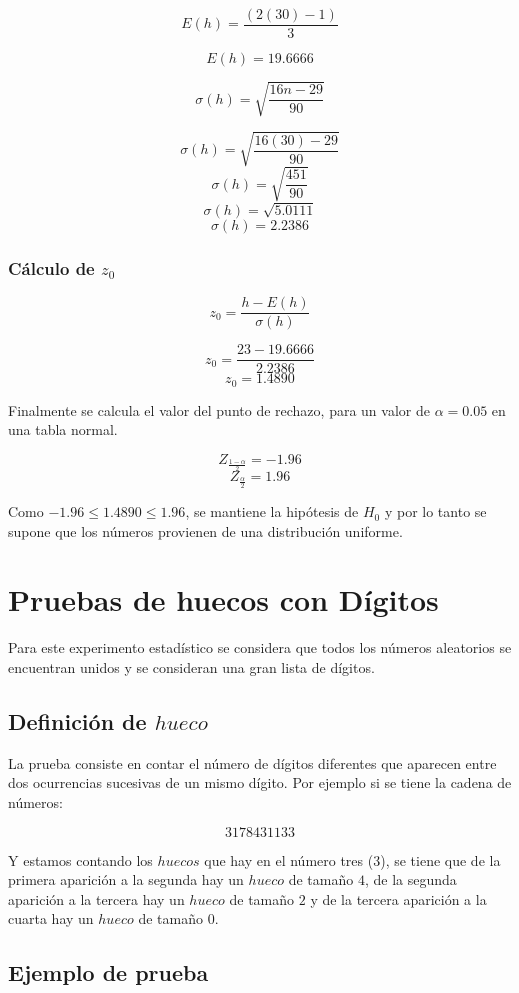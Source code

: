 $$E(h) = \frac{(2(30)-1)}{3}$$

$$E(h) = 19.6666$$

$$\sigma(h) = \sqrt{\frac{16n-29}{90}}$$

$$\sigma(h) = \sqrt{\frac{16(30)-29}{90}}$$
$$\sigma(h) = \sqrt{\frac{451}{90}}$$
$$\sigma(h) = \sqrt{5.0111}$$
$$\sigma(h) = 2.2386$$

\subsubsection{Cálculo de $z_0$}

$$z_0 = \frac{h-E(h)}{\sigma(h)}$$

$$z_0 = \frac{23-19.6666}{2.2386}$$
$$z_0   = 1.4890$$

Finalmente se calcula el valor del punto de rechazo, para un valor de $\alpha = 0.05$ en una tabla normal.

$$Z_{\frac{1-\alpha}{2}} = -1.96$$
$$Z_{\frac{\alpha}{2}}   = 1.96$$

Como  $-1.96 \leq 1.4890 \leq 1.96$, se mantiene la hipótesis de $H_0$ y por lo tanto se supone que los números provienen de una distribución uniforme.

\section{Pruebas de huecos con Dígitos}
Para este experimento estadístico se considera que todos los números aleatorios se encuentran unidos y se consideran una gran lista de dígitos. 

\subsection{Definición de $hueco$}

La prueba consiste en contar el número de dígitos diferentes que aparecen entre dos ocurrencias sucesivas de un mismo dígito. Por ejemplo si se tiene la cadena de números:

$$3178431133$$


Y estamos contando los $huecos$ que hay en el número tres (3), se tiene que de la primera aparición a la segunda hay un $hueco$ de tamaño $4$, de la segunda aparición a la tercera hay un $hueco$ de tamaño $2$ y de la tercera aparición a la cuarta hay un $hueco$ de tamaño $0$.

\subsection{Ejemplo de prueba}

